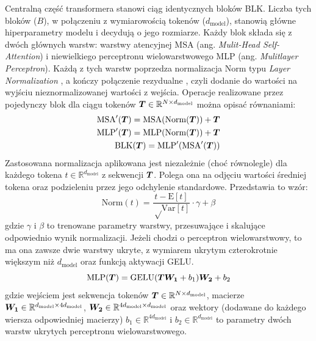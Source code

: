 Centralną część transformera stanowi ciąg identycznych bloków BLK. Liczba tych bloków ($B$), w połączeniu z wymiarowością tokenów ($d_{\mathrm{model}}$), stanowią główne hiperparametry modelu i decydują o jego rozmiarze. Każdy blok składa się z dwóch głównych warstw: warstwy atencyjnej MSA (ang. \emph{Mulit-Head Self-Attention}) i niewielkiego perceptronu wielowarstwowego MLP (ang.  \emph{Mulitlayer Perceptron}). Każdą z tych warstw poprzedza normalizacja Norm typu \emph{Layer Normalization} \cite{ba_layer_2016}, a kończy połączenie rezydualne \cite{he_deep_2015}, czyli dodanie do wartości na wyjściu nieznormalizowanej wartości z wejścia. Operacje realizowane przez pojedynczy blok dla ciągu tokenów $\boldsymbol{T} \in \mathbb{R}^{N \times d_{\mathrm{model}}}$ można opisać równaniami:
\begin{eqnarray}
     \textrm{MSA}'(\boldsymbol{T}) = \textrm{MSA}(\textrm{Norm}(\boldsymbol{T})) + \boldsymbol{T} \\
     \textrm{MLP}'(\boldsymbol{T}) = \textrm{MLP}(\textrm{Norm}(\boldsymbol{T})) + \boldsymbol{T} \\
     \textrm{BLK}(\boldsymbol{T}) = \textrm{MLP}'(\textrm{MSA}'(\boldsymbol{T}))
\end{eqnarray}
Zastosowana normalizacja aplikowana jest niezależnie (choć równolegle) dla każdego tokena $t \in \mathbb{R}^{d_{\mathrm{model}}}$ z sekwencji $\boldsymbol{T}$. Polega ona na odjęciu wartości średniej tokena oraz podzieleniu przez jego odchylenie standardowe. Przedstawia to wzór:
\begin{equation}
    \textrm{Norm}(t) = \frac{t - \textrm{E}[t]}{\sqrt \textrm{Var}[t]} \cdot \gamma + \beta
\end{equation}
gdzie $\gamma$ i $\beta$ to trenowane parametry warstwy, przesuwające i skalujące odpowiednio wynik normalizacji. Jeżeli chodzi o perceptron wielowarstwowy, to ma ona zawsze dwie warstwy ukryte, z wymiarem ukrytym czterokrotnie większym niż $d_{\mathrm{model}}$ oraz funkcją aktywacji GELU.
\begin{equation}
    \textrm{MLP}(\boldsymbol{T}) = \textrm{GELU}(\boldsymbol{T}\boldsymbol{W_1} + b_1)\boldsymbol{W_2} + b_2
\end{equation}
gdzie wejściem jest sekwencja tokenów $\boldsymbol{T} \in \mathbb{R}^{N \times d_{\mathrm{model}}}$, macierze $\boldsymbol{W_1} \in \mathbb{R}^{d_{\mathrm{model}} \times 4d_{\mathrm{model}}}$, $\boldsymbol{W_2} \in \mathbb{R}^{4d_{\mathrm{model}} \times d_{\mathrm{model}}}$ oraz wektory (dodawane do każdego wiersza odpowiedniej macierzy) $b_1 \in \mathbb{R}^{4d_{\mathrm{model}}}$ i $b_2 \in \mathbb{R}^{d_{\mathrm{model}}}$ to parametry dwóch warstw ukrytych perceptronu wielowarstwowego.

